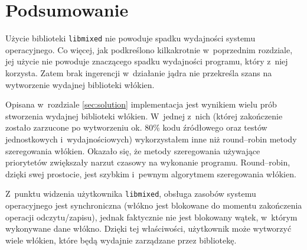 \documentclass[12pt]{mwart}
\newcommand{\code}{\texttt}
\begin{document}
\section{Podsumowanie}
\label{sec:summary}
\indent
  Użycie biblioteki \code{libmixed} nie powoduje spadku wydajności systemu operacyjnego. Co więcej, jak podkreślono kilkakrotnie w~poprzednim rozdziale, jej użycie nie powoduje
  znaczącego spadku wydajności programu, który z~niej korzysta. Zatem brak ingerencji w~działanie jądra nie przekreśla szans na wytworzenie wydajnej biblioteki włókien.
\par
%
\indent
  Opisana w~rozdziale \ref{sec:solution} implementacja jest wynikiem wielu prób stworzenia wydajnej biblioteki włókien. W~jednej z~nich (której zakończenie zostało zarzucone
  po wytworzeniu ok. 80\% kodu źródłowego oraz testów jednostkowych i~wydajnościowych) wykorzystałem inne niż round--robin metody szeregowania włókien.
  Okazało się, że metody szeregowania używające priorytetów zwiększały narzut czasowy na wykonanie programu. Round--robin, dzięki swej prostocie, jest szybkim i~pewnym algorytmem
  szeregowania włókien.
\par
%
\indent
  Z~punktu widzenia użytkownika \code{libmixed}, obsługa zasobów systemu operacyjnego jest synchroniczna (włókno jest blokowane do momentu zakończenia operacji odczytu/zapisu),
  jednak faktycznie nie jest blokowany wątek, w~którym wykonywane dane włókno. Dzięki tej właściwości, użytkownik może wytworzyć wiele włókien, które będą wydajnie zarządzane przez
  bibliotekę.
\par
%
%
\newpage
\rhead{\empty}

\end{document}
